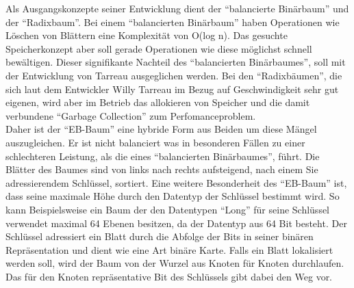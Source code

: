 \documentclass[a4paper,11pt,oneside,%
headsepline,												%
footsepline,												%
bibtotocnumbered									%
]{scrreprt}
\begin{document}
Als Ausgangskonzepte seiner Entwicklung dient der \enquote{balancierte Binärbaum} und der \enquote{Radixbaum}. Bei einem \enquote{balancierten Binärbaum} haben  Operationen wie Löschen von Blättern  eine Komplexität von O(log n). Das gesuchte Speicherkonzept aber soll gerade Operationen wie diese möglichst schnell bewältigen. Dieser signifikante Nachteil des \enquote{balancierten Binärbaumes}, soll mit der Entwicklung von Tarreau ausgeglichen werden. Bei den \enquote{Radixbäumen}, die sich laut dem Entwickler Willy Tarreau\autocite[Absatz Introduction]{Tarreau} im Bezug auf Geschwindigkeit sehr gut eigenen, wird aber im Betrieb das allokieren von Speicher und die damit verbundene \enquote{Garbage Collection} zum Perfomanceproblem.\\

Daher ist der \enquote{EB-Baum} eine hybride Form aus Beiden um diese Mängel auszugleichen. Er ist nicht balanciert was in besonderen Fällen zu einer schlechteren Leistung, als die eines \enquote{balancierten Binärbaumes}, führt. Die Blätter des Baumes sind von links nach rechts aufsteigend, nach einem Sie adressierendem Schlüssel, sortiert.
Eine weitere Besonderheit des \enquote{EB-Baum} ist, dass seine maximale Höhe durch den Datentyp der Schlüssel bestimmt wird. So kann Beispielsweise ein Baum der den Datentypen \enquote{Long} für seine Schlüssel verwendet maximal 64 Ebenen besitzen, da der Datentyp aus 64 Bit besteht. Der Schlüssel adressiert ein Blatt durch die Abfolge der Bits in seiner binären Repräsentation und dient wie eine Art binäre Karte. Falls ein Blatt lokalisiert werden soll, wird der Baum von der Wurzel aus Knoten für Knoten durchlaufen. Das für den Knoten repräsentative Bit des Schlüssels gibt dabei den Weg vor.
\end{document}
